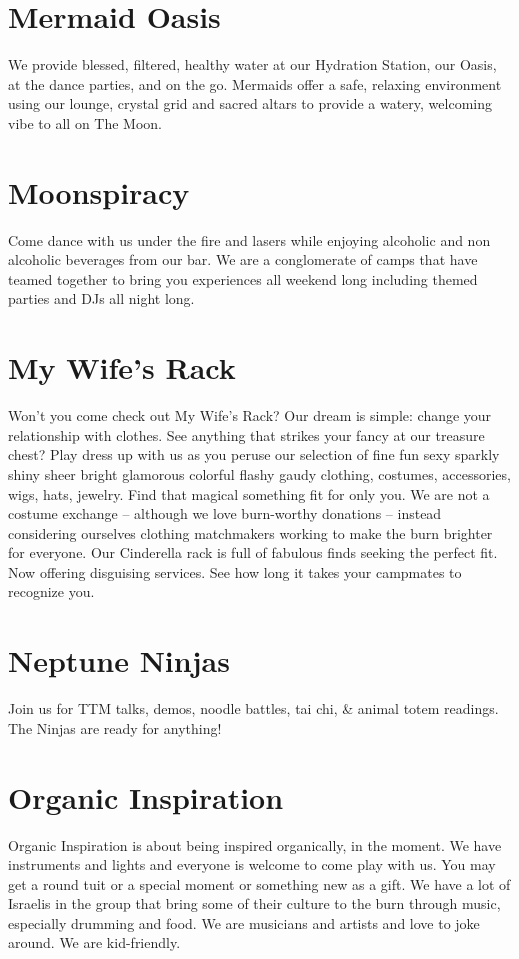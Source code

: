 \section*{Mermaid Oasis}
We provide blessed, filtered, healthy water at our Hydration Station, our Oasis, at the dance parties, and on the go. Mermaids offer a safe, relaxing environment using our lounge, crystal grid and sacred altars to provide a watery, welcoming vibe to all on The Moon.


\section*{Moonspiracy}
Come dance with us under the fire and lasers while enjoying alcoholic and non alcoholic beverages from our bar. We are a conglomerate of camps that have teamed together to bring you experiences all weekend long including themed parties and DJs all night long. 


\section*{My Wife's Rack}
Won't you come check out My Wife's Rack? Our dream is simple: change your relationship with clothes. See anything that strikes your fancy at our treasure chest? Play dress up with us as you peruse our selection of fine fun sexy sparkly shiny sheer bright glamorous colorful flashy gaudy clothing, costumes, accessories, wigs, hats, jewelry. Find that magical something fit for only you. We are not a costume exchange -- although we love burn-worthy donations -- instead considering ourselves clothing matchmakers working to make the burn brighter for everyone. Our Cinderella rack is full of fabulous finds seeking the perfect fit. Now offering disguising services. See how long it takes your campmates to recognize you. 


\section*{Neptune Ninjas}
Join us for TTM talks, demos, noodle battles, tai chi, \& animal totem readings. The Ninjas are ready for anything!  


\section*{Organic Inspiration}
Organic Inspiration is about being inspired organically, in the moment. We have instruments and lights and everyone is welcome to come play with us. You may get a round tuit or a special moment or something new as a gift. We have a lot of Israelis in the group that bring some of their culture to the burn through music, especially drumming and food. We are musicians and artists and love to joke around. We are kid-friendly. 


